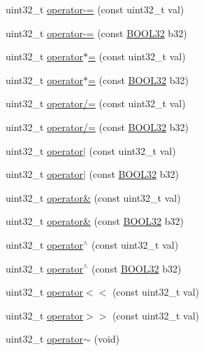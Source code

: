 \begin{DoxyCompactItemize}
\item 
uint32\+\_\+t \hyperlink{struct_b_o_o_l32_abf721f5ec88e5f185b6cc709b935e3ad}{operator-\/=} (const uint32\+\_\+t val)
\item 
uint32\+\_\+t \hyperlink{struct_b_o_o_l32_a5dceacd5e79d5f79229ccb8fd74ad32c}{operator-\/=} (const \hyperlink{struct_b_o_o_l32}{B\+O\+O\+L32} b32)
\item 
uint32\+\_\+t \hyperlink{struct_b_o_o_l32_a84c538fdd716cefd16b143e1c9db9f44}{operator$\ast$=} (const uint32\+\_\+t val)
\item 
uint32\+\_\+t \hyperlink{struct_b_o_o_l32_addac8d9da148feee45ec85a94124709a}{operator$\ast$=} (const \hyperlink{struct_b_o_o_l32}{B\+O\+O\+L32} b32)
\item 
uint32\+\_\+t \hyperlink{struct_b_o_o_l32_a45f0a4ea5055b0646b7c236ff8a458e3}{operator/=} (const uint32\+\_\+t val)
\item 
uint32\+\_\+t \hyperlink{struct_b_o_o_l32_a042383be151078a1ca145690c338d075}{operator/=} (const \hyperlink{struct_b_o_o_l32}{B\+O\+O\+L32} b32)
\item 
uint32\+\_\+t \hyperlink{struct_b_o_o_l32_a5565718e0df53727e98dafdf0920dc8b}{operator$\vert$} (const uint32\+\_\+t val)
\item 
uint32\+\_\+t \hyperlink{struct_b_o_o_l32_a12bc7b47d1fe18aea25b1f35393184db}{operator$\vert$} (const \hyperlink{struct_b_o_o_l32}{B\+O\+O\+L32} b32)
\item 
uint32\+\_\+t \hyperlink{struct_b_o_o_l32_aab983a7854c81a513ed5b83cbd250f6e}{operator\&} (const uint32\+\_\+t val)
\item 
uint32\+\_\+t \hyperlink{struct_b_o_o_l32_af064fda66fad699a1c5f5272b83b668e}{operator\&} (const \hyperlink{struct_b_o_o_l32}{B\+O\+O\+L32} b32)
\item 
uint32\+\_\+t \hyperlink{struct_b_o_o_l32_a74841bcb1bc7a60dd6326069548baa0f}{operator$^\wedge$} (const uint32\+\_\+t val)
\item 
uint32\+\_\+t \hyperlink{struct_b_o_o_l32_ad64db9cff2ce76b97c43fc48c0c3ba30}{operator$^\wedge$} (const \hyperlink{struct_b_o_o_l32}{B\+O\+O\+L32} b32)
\item 
uint32\+\_\+t \hyperlink{struct_b_o_o_l32_a8c7d57fe8f56815e031bfa2124a6494c}{operator$<$$<$} (const uint32\+\_\+t val)
\item 
uint32\+\_\+t \hyperlink{struct_b_o_o_l32_ae8b32e977d86d7062cb74b7899fa2091}{operator$>$$>$} (const uint32\+\_\+t val)
\item 
uint32\+\_\+t \hyperlink{struct_b_o_o_l32_a4631d6c135bd999da74d05c6892fe2b3}{operator$\sim$} (void)

\end{DoxyCompactItemize}
